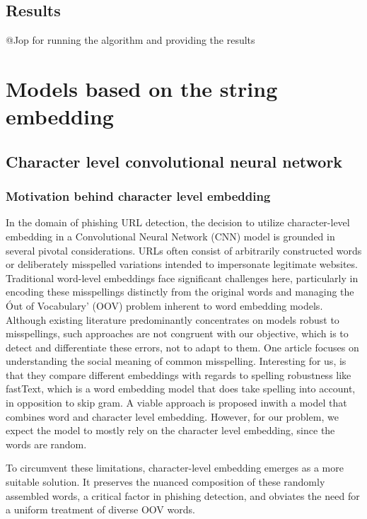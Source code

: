 \documentclass{article}
\begin{document}
    \subsection{Results}\label{subsec:results2}
    @Jop for running the algorithm and providing the results


    \section{Models based on the string embedding}\label{sec:models-based-on-the-string-embedding}

    \subsection{Character level convolutional neural network}\label{subsec:character-level-convolutional-neural-network}

    \subsubsection{Motivation behind character level embedding}

    In the domain of phishing URL detection, the decision to utilize character-level embedding in a Convolutional Neural Network (CNN) model is grounded in several pivotal considerations.
    URLs often consist of arbitrarily constructed words or deliberately misspelled variations intended to impersonate legitimate websites.
    Traditional word-level embeddings face significant challenges here, particularly in encoding these misspellings distinctly from the original words and managing the \'Out of Vocabulary' (OOV) problem inherent to word embedding models.
    Although existing literature predominantly concentrates on models robust to misspellings, such approaches are not congruent with our objective, which is to detect and differentiate these errors, not to adapt to them.
    One article focuses on understanding the social meaning of common misspelling\cite{OOVmispelling}.
    Interesting for us, is that they compare different embeddings with regards to spelling robustness like fastText, which is a word embedding model that does take spelling into account, in opposition to skip gram.
    A viable approach is proposed in\cite{WordCharacterEmbeddings}with a model that combines word and character level embedding.
    However, for our problem, we expect the model to mostly rely on the character level embedding, since the words are random.

    To circumvent these limitations, character-level embedding emerges as a more suitable solution.
    It preserves the nuanced composition of these randomly assembled words, a critical factor in phishing detection, and obviates the need for a uniform treatment of diverse OOV words.
\end{document}
